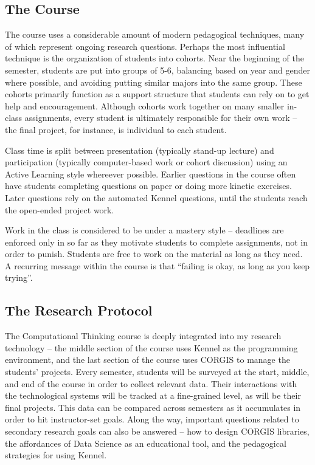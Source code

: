 \subsection{The Course}

The course uses a considerable amount of modern pedagogical techniques, many of which represent ongoing research questions.
Perhaps the most influential technique is the organization of students into cohorts.
Near the beginning of the semester, students are put into groups of 5-6, balancing based on year and gender where possible, and avoiding putting similar majors into the same group.
These cohorts primarily function as a support structure that students can rely on to get help and encouragement.
Although cohorts work together on many smaller in-class assignments, every student is ultimately responsible for their own work -- the final project, for instance, is individual to each student.

Class time is split between presentation (typically stand-up lecture) and participation (typically computer-based work or cohort discussion) using an Active Learning style whereever possible.
Earlier questions in the course often have students completing questions on paper or doing more kinetic exercises.
Later questions rely on the automated Kennel questions, until the students reach the open-ended project work.

Work in the class is considered to be under a mastery style -- deadlines are enforced only in so far as they motivate students to complete assignments, not in order to punish.
Students are free to work on the material as long as they need.
A recurring message within the course is that ``failing is okay, as long as you keep trying''.

\subsection{The Research Protocol}

The Computational Thinking course is deeply integrated into my research technology -- the middle section of the course uses Kennel as the programming environment, and the last section of the course uses CORGIS to manage the students' projects.
Every semester, students will be surveyed at the start, middle, and end of the course in order to collect relevant data.
Their interactions with the technological systems will be tracked at a fine-grained level, as will be their final projects.
This data can be compared across semesters as it accumulates in order to hit instructor-set goals.
Along the way, important questions related to secondary research goals can also be answered -- how to design CORGIS libraries, the affordances of Data Science as an educational tool, and the pedagogical strategies for using Kennel.

